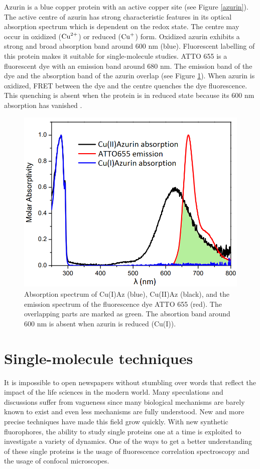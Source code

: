 \documentclass[twoside,single]{lion-msc}
\begin{document}
Azurin is a blue copper protein with an active copper site (see Figure \ref{azurin}). The active centre of azurin has strong characteristic features in its optical absorption spectrum which is dependent on the redox state. The centre may occur in oxidized ($\textup{Cu}^{2+}$) or reduced ($\textup{Cu}^{+}$) form. Oxidized azurin exhibits a strong and broad absorption band around 600 nm (blue). Fluorescent labelling of this protein makes it suitable for single-molecule studies. ATTO 655 is a fluorescent dye with an emission band around 680 nm. The emission band of the dye and the absorption band of the azurin overlap (see Figure \ref{absorption}). When azurin is oxidized, FRET between the dye and the centre quenches the dye fluorescence. This quenching is absent when the protein is in reduced state because its 600 nm absorption has vanished \cite{Tabares2014}.
\begin{figure}[ht!]
\centering
\includegraphics[width=\textwidth]{absorp.png}
\caption{Absorption spectrum of Cu(I)Az (blue), Cu(II)Az (black), and the emission spectrum of the fluorescence dye ATTO 655 (red). The overlapping parts are marked as green. The absortion band around 600 nm is absent when azurin is reduced (Cu(I)).} 
\label{absorption}
\end{figure}


\section{Single-molecule techniques}
It is impossible to open newspapers without stumbling over words that reflect the impact of the life sciences in the modern world. Many speculations and discussions suffer from vagueness since many biological mechanisms are barely known to exist and even less mechanisms are fully understood. New and more precise techniques have made this field grow quickly. With new synthetic fluorophores, the ability to study single proteins one at a time is exploited to investigate a variety of dynamics.  One of the ways to get a better understanding of these single proteins is the usage of fluorescence correlation spectroscopy and the usage of confocal microscopes. 
\end{document}

